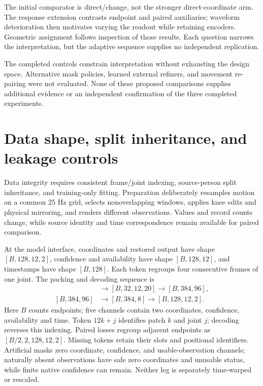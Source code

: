 The initial comparator is direct/change, not the stronger direct-coordinate arm. The response extension contrasts endpoint and paired auxiliaries; waveform deterioration then motivates varying the readout while retaining encoders. Geometric assignment follows inspection of those results. Each question narrows the interpretation, but the adaptive sequence supplies no independent replication.



The completed controls constrain interpretation without exhausting the design space. Alternative mask policies, learned external refiners, and movement re-pairing were not evaluated. None of these proposed comparisons supplies additional evidence or an independent confirmation of the three completed experiments.

\clearpage
\section{Data shape, split inheritance, and leakage controls}
\label{app:integrity}
Data integrity requires consistent frame/joint indexing, source-person split inheritance, and training-only fitting. Preparation deliberately resamples motion on a common 25 Hz grid, selects nonoverlapping windows, applies knee edits and physical mirroring, and renders different observations. Values and record counts change, while source identity and time correspondence remain available for paired comparison.

At the model interface, coordinates and restored output have shape $[B,128,12,2]$, confidence and availability have shape $[B,128,12]$, and timestamps have shape $[B,128]$. Each token regroups four consecutive frames of one joint. The packing and decoding sequence is
\begin{align}
[B,128,12,5]&\longrightarrow[B,32,12,20]\longrightarrow[B,384,96],\\
[B,384,96]&\longrightarrow[B,384,8]\longrightarrow[B,128,12,2].
\end{align}
Here $B$ counts endpoints; five channels contain two coordinates, confidence, availability and time. Token $12k+j$ identifies patch $k$ and joint $j$; decoding reverses this indexing. Paired losses regroup adjacent endpoints as $[B/2,2,128,12,2]$. Missing tokens retain their slots and positional identifiers. Artificial masks zero coordinate, confidence, and usable-observation channels; naturally absent observations have safe zero coordinates and unusable status, while finite native confidence can remain. Neither leg is separately time-warped or rescaled.

